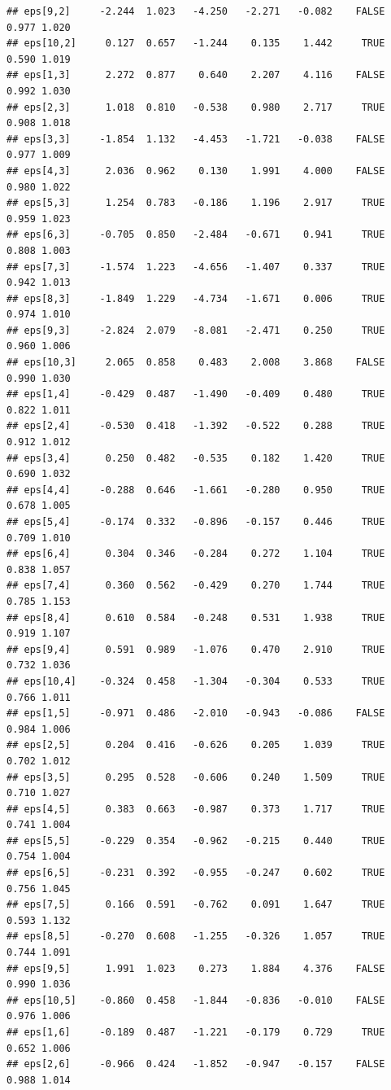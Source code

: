 \documentclass[]{article}
\begin{document}
\begin{verbatim}
## eps[9,2]     -2.244  1.023   -4.250   -2.271   -0.082    FALSE 0.977 1.020
## eps[10,2]     0.127  0.657   -1.244    0.135    1.442     TRUE 0.590 1.019
## eps[1,3]      2.272  0.877    0.640    2.207    4.116    FALSE 0.992 1.030
## eps[2,3]      1.018  0.810   -0.538    0.980    2.717     TRUE 0.908 1.018
## eps[3,3]     -1.854  1.132   -4.453   -1.721   -0.038    FALSE 0.977 1.009
## eps[4,3]      2.036  0.962    0.130    1.991    4.000    FALSE 0.980 1.022
## eps[5,3]      1.254  0.783   -0.186    1.196    2.917     TRUE 0.959 1.023
## eps[6,3]     -0.705  0.850   -2.484   -0.671    0.941     TRUE 0.808 1.003
## eps[7,3]     -1.574  1.223   -4.656   -1.407    0.337     TRUE 0.942 1.013
## eps[8,3]     -1.849  1.229   -4.734   -1.671    0.006     TRUE 0.974 1.010
## eps[9,3]     -2.824  2.079   -8.081   -2.471    0.250     TRUE 0.960 1.006
## eps[10,3]     2.065  0.858    0.483    2.008    3.868    FALSE 0.990 1.030
## eps[1,4]     -0.429  0.487   -1.490   -0.409    0.480     TRUE 0.822 1.011
## eps[2,4]     -0.530  0.418   -1.392   -0.522    0.288     TRUE 0.912 1.012
## eps[3,4]      0.250  0.482   -0.535    0.182    1.420     TRUE 0.690 1.032
## eps[4,4]     -0.288  0.646   -1.661   -0.280    0.950     TRUE 0.678 1.005
## eps[5,4]     -0.174  0.332   -0.896   -0.157    0.446     TRUE 0.709 1.010
## eps[6,4]      0.304  0.346   -0.284    0.272    1.104     TRUE 0.838 1.057
## eps[7,4]      0.360  0.562   -0.429    0.270    1.744     TRUE 0.785 1.153
## eps[8,4]      0.610  0.584   -0.248    0.531    1.938     TRUE 0.919 1.107
## eps[9,4]      0.591  0.989   -1.076    0.470    2.910     TRUE 0.732 1.036
## eps[10,4]    -0.324  0.458   -1.304   -0.304    0.533     TRUE 0.766 1.011
## eps[1,5]     -0.971  0.486   -2.010   -0.943   -0.086    FALSE 0.984 1.006
## eps[2,5]      0.204  0.416   -0.626    0.205    1.039     TRUE 0.702 1.012
## eps[3,5]      0.295  0.528   -0.606    0.240    1.509     TRUE 0.710 1.027
## eps[4,5]      0.383  0.663   -0.987    0.373    1.717     TRUE 0.741 1.004
## eps[5,5]     -0.229  0.354   -0.962   -0.215    0.440     TRUE 0.754 1.004
## eps[6,5]     -0.231  0.392   -0.955   -0.247    0.602     TRUE 0.756 1.045
## eps[7,5]      0.166  0.591   -0.762    0.091    1.647     TRUE 0.593 1.132
## eps[8,5]     -0.270  0.608   -1.255   -0.326    1.057     TRUE 0.744 1.091
## eps[9,5]      1.991  1.023    0.273    1.884    4.376    FALSE 0.990 1.036
## eps[10,5]    -0.860  0.458   -1.844   -0.836   -0.010    FALSE 0.976 1.006
## eps[1,6]     -0.189  0.487   -1.221   -0.179    0.729     TRUE 0.652 1.006
## eps[2,6]     -0.966  0.424   -1.852   -0.947   -0.157    FALSE 0.988 1.014

\end{verbatim}
\end{document}
